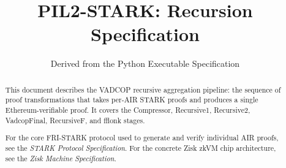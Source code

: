 \documentclass[11pt,a4paper]{article}
\title{PIL2-STARK: Recursion Specification}
\author{Derived from the Python Executable Specification}
\date{}
\begin{document}
\maketitle

\begin{abstract}
This document describes the VADCOP recursive aggregation pipeline:
the sequence of proof transformations that takes per-AIR STARK proofs
and produces a single Ethereum-verifiable proof.
It covers the Compressor, Recursive1, Recursive2, VadcopFinal,
RecursiveF, and fflonk stages.

For the core FRI-STARK protocol used to generate and verify individual
AIR proofs, see the \emph{STARK Protocol Specification}.
For the concrete Zisk zkVM chip architecture,
see the \emph{Zisk Machine Specification}.
\end{abstract}

\tableofcontents
\newpage


\end{document}
